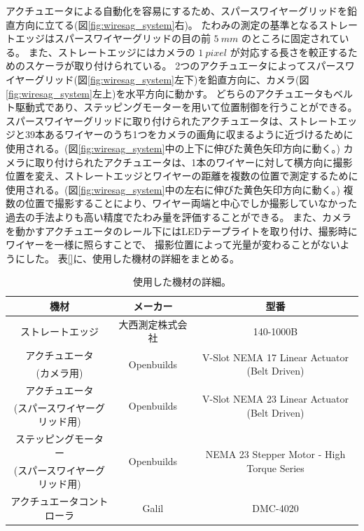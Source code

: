 \documentclass[../../main.tex]{subfiles}
\begin{document}
アクチュエータによる自動化を容易にするため、スパースワイヤーグリッドを鉛直方向に立てる(図\ref{fig:wiresag_system}右)。
たわみの測定の基準となるストレートエッジはスパースワイヤーグリッドの目の前 $\SI{5}{mm}$ のところに固定されている。
また、ストレートエッジにはカメラの $\SI{1}{pixel}$ が対応する長さを較正するためのスケーラが取り付けられている。
2つのアクチュエータによってスパースワイヤーグリッド(図\ref{fig:wiresag_system}左下)を鉛直方向に、カメラ(図\ref{fig:wiresag_system}左上)を水平方向に動かす。
どちらのアクチュエータもベルト駆動式であり、ステッピングモーターを用いて位置制御を行うことができる。
スパースワイヤーグリッドに取り付けられたアクチュエータは、ストレートエッジと39本あるワイヤーのうち1つをカメラの画角に収まるように近づけるために使用される。(図\ref{fig:wiresag_system}中の上下に伸びた黄色矢印方向に動く。)
カメラに取り付けられたアクチュエータは、1本のワイヤーに対して横方向に撮影位置を変え、ストレートエッジとワイヤーの距離を複数の位置で測定するために使用される。(図\ref{fig:wiresag_system}中の左右に伸びた黄色矢印方向に動く。)
複数の位置で撮影することにより、ワイヤー両端と中心でしか撮影していなかった過去の手法よりも高い精度でたわみ量を評価することができる。
また、カメラを動かすアクチュエータのレール下にはLEDテープライトを取り付け、撮影時にワイヤーを一様に照らすことで、
撮影位置によって光量が変わることがないようにした。
表\ref{}に、使用した機材の詳細をまとめる。
\begin{table}[H]
    \centering
    \caption{使用した機材の詳細。}
    \begin{tabular}{ccc}
        \hline\hline
        機材 & メーカー & 型番 \\
        \hline
        ストレートエッジ & 大西測定株式会社 & 140-1000B \\
        \hline
        アクチュエータ & \multirow{2}{*}{Openbuilds} & \multirow{2}{*}{V-Slot NEMA 17 Linear Actuator (Belt Driven)} \\
        (カメラ用) & & \\
        \hline
        アクチュエータ & \multirow{2}{*}{Openbuilds} & \multirow{2}{*}{V-Slot NEMA 23 Linear Actuator (Belt Driven)} \\
        (スパースワイヤーグリッド用) & & \\
        \hline
        ステッピングモーター & \multirow{2}{*}{Openbuilds} & \multirow{2}{*}{NEMA 23 Stepper Motor - High Torque Series} \\
        (スパースワイヤーグリッド用) & & \\
        \hline
        アクチュエータコントローラ & Galil & DMC-4020 \\
        \hline\hline
    \end{tabular}
\end{table}
\end{document}
